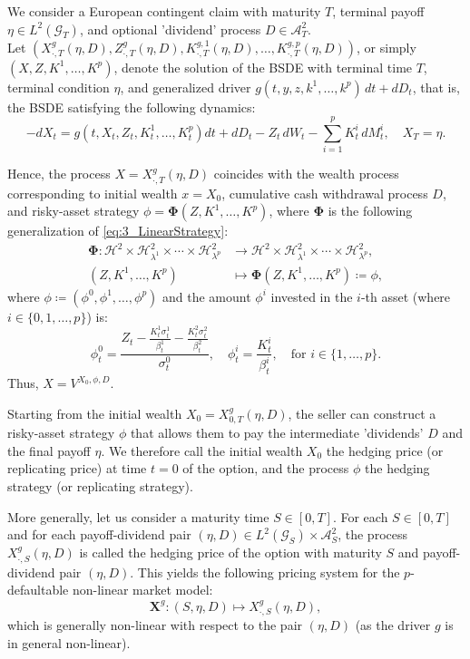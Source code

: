 \documentclass[11pt,a4paper]{article}
\numberwithin{equation}{section}
\theoremstyle{newPlain}
\theoremstyle{newDefinition}
\theoremstyle{newRemark}
\begin{document}
We consider a European contingent claim with maturity $T$, terminal payoff  $\eta \in L^2(\mathcal{G}_T)$, and optional 'dividend' process $D \in \mathcal{A}_T^2$. \\Let $(X_{\cdot,T}^g(\eta,D), Z_{\cdot,T}^g(\eta,D), K_{\cdot,T}^{g,1}(\eta,D), \ldots, K_{\cdot,T}^{g,p}(\eta,D))$, or simply $(X, Z, K^1, \ldots, K^p)$, denote the solution of the BSDE with terminal time $T$, terminal condition $\eta$, and generalized driver $g(t,y,z,k^1,\ldots,k^p)\,dt + dD_t$, that is, the BSDE satisfying the following dynamics:
\begin{equation}\label{eq:3_BSDEnon-linear1}
    -dX_t = g(t,X_t,Z_t,K_t^1,\ldots,K_t^p)dt + dD_t - Z_t\,dW_t - \sum_{i=1}^p K_t^i\,dM_t^i, \quad X_T = \eta.
\end{equation}

Hence, the process $X = X_{\cdot,T}^g(\eta,D)$ coincides with the wealth process corresponding to initial wealth $x = X_0$, cumulative cash withdrawal process $D$, and risky-asset strategy $\phi = \mathbf{\Phi}(Z,K^1,\ldots,K^p)$, where $\mathbf{\Phi}$ is the following generalization of \eqref{eq:3_LinearStrategy}:
\begin{align*}
    \mathbf{\Phi} : \mathcal{H}^2 \times \mathcal{H}_{\lambda^1}^2 \times \cdots \times \mathcal{H}_{\lambda^p}^2 &\rightarrow \mathcal{H}^2 \times \mathcal{H}_{\lambda^1}^2 \times \cdots \times \mathcal{H}_{\lambda^p}^2, \\
    (Z, K^1, \ldots, K^p) &\mapsto \mathbf{\Phi}(Z, K^1, \ldots, K^p) \coloneqq \phi,
\end{align*}
where $\phi\coloneqq(\phi^0,\phi^1,\ldots,\phi^p)$ and the amount $\phi^i$ invested in the $i$-th asset (where $i\in\{0,1,\ldots,p\}$) is:
\begin{equation}
    \phi_t^0 = \frac{Z_t-\frac{K_t^1\sigma_t^1}{\beta_t^1}-\frac{K_t^2\sigma_t^2}{\beta_t^2}}{\sigma_t^0},\quad\phi_t^i=\frac{K_t^i}{\beta_t^i},\quad\text{for }i\in\{1,\ldots,p\}.
\end{equation}
Thus,  $X = V^{X_0,\phi,D}$.

Starting from the initial wealth $X_0 = X_{0,T}^g(\eta,D)$, the seller can construct a risky-asset strategy $\phi$ that allows them to pay the intermediate 'dividends' $D$ and the final payoff $\eta$. We therefore call the initial wealth $X_0$ the hedging price (or replicating price) at time $t = 0$ of the option, and the process $\phi$ the hedging strategy (or replicating strategy).

More generally, let us  consider a maturity time $S \in [0,T]$. For each $S \in [0,T]$ and for each payoff-dividend pair $(\eta,D) \in L^2(\mathcal{G}_S) \times \mathcal{A}_S^2$, the process $X_{\cdot,S}^g(\eta,D)$ is called the hedging price of the option with maturity $S$ and payoff-dividend pair $(\eta,D)$. This yields the following pricing system for the $p$-defaultable non-linear market model:
\begin{equation}\label{eq:3_non-linearPricingSystem1}
    \mathbf{X}^g : (S, \eta, D) \mapsto X_{\cdot,S}^g(\eta,D),
\end{equation}
which is generally non-linear with respect to the pair $(\eta,D)$ (as the driver $g$ is in general non-linear).
\end{document}
